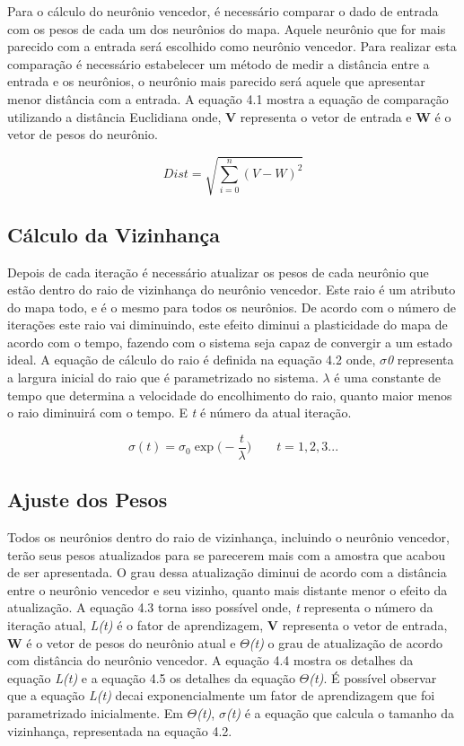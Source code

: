 Para o cálculo do neurônio vencedor, é necessário comparar o dado de entrada com os pesos de cada um dos neurônios do mapa. Aquele neurônio que for mais parecido com a entrada será escolhido como neurônio vencedor. Para realizar esta comparação é necessário estabelecer um método de medir a distância entre a entrada e os neurônios, o neurônio mais parecido será aquele que apresentar menor distância com a entrada. A equação 4.1 mostra a equação de comparação utilizando a distância Euclidiana onde, \textbf{V} representa o vetor de entrada e \textbf{W} é o vetor de pesos do neurônio.

\begin{equation}
    Dist =  \sqrt{\sum_{i=0}^{n} (V - W)^{2}} 
\end{equation}
  
\subsection{Cálculo da Vizinhança}
Depois de cada iteração é necessário atualizar os pesos de cada neurônio que estão dentro do raio de vizinhança do neurônio vencedor. Este raio é um atributo do mapa todo, e é o mesmo para todos os neurônios. De acordo com o número de iterações este raio vai diminuindo, este efeito diminui a plasticidade do mapa de acordo com o tempo, fazendo com o sistema seja capaz de convergir a um estado ideal. A equação de cálculo do raio é definida na equação 4.2 onde, \textit{$\sigma$0} representa a largura inicial do raio que é parametrizado no sistema. \textit{$\lambda$} é uma constante de tempo que determina a velocidade do encolhimento do raio, quanto maior menos o raio diminuirá com o tempo. E \textit{t} é número da atual iteração. 

\begin{equation}
 \sigma (t) =  \sigma_{0} \exp   \big(- \frac{t}{\lambda}\big) \quad \quad t=1,2,3...
\end{equation} 

\subsection{Ajuste dos Pesos}
Todos os neurônios dentro do raio de vizinhança, incluindo o neurônio vencedor, terão seus pesos atualizados para se parecerem mais com a amostra que acabou de ser apresentada. O grau dessa atualização diminui de acordo com a distância entre o neurônio vencedor e seu vizinho, quanto mais distante menor o efeito da atualização. A equação 4.3 torna isso possível onde, \textit{t} representa o número da iteração atual, \textit{L(t)} é o fator de aprendizagem, \textbf{V} representa o vetor de entrada, \textbf{W} é o vetor de pesos do neurônio atual e \textit{$\Theta$(t)} o grau de atualização de acordo com distância do neurônio vencedor. A equação 4.4 mostra os detalhes da equação \textit{L(t)} e a equação 4.5 os detalhes da equação \textit{$\Theta$(t)}. É possível observar que a equação \textit{L(t)} decai exponencialmente um fator de aprendizagem que foi parametrizado inicialmente. Em \textit{$\Theta$(t)}, \textit{\textit{$\sigma$(t)}} é a equação que calcula o tamanho da vizinhança, representada na equação 4.2.



